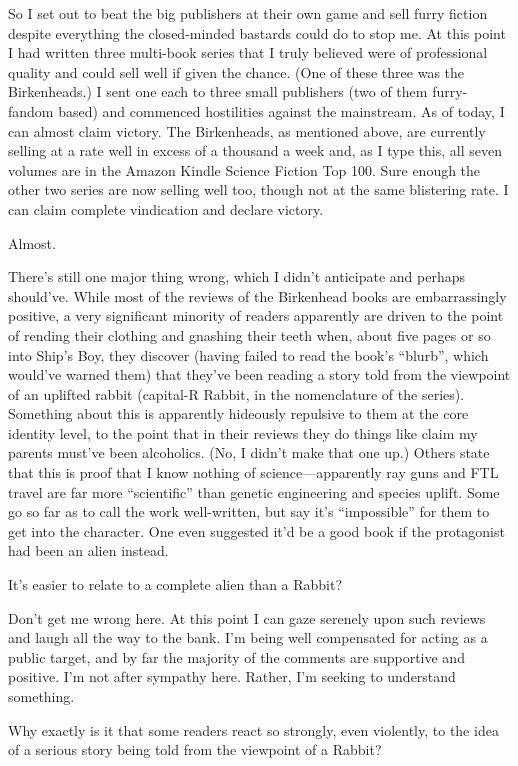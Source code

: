 So I set out to beat the big publishers at their own game and sell furry fiction despite everything the closed-minded bastards could do to stop me. At this point I had written three multi-book series that I truly believed were of professional quality and could sell well if given the chance. (One of these three was the Birkenheads.) I sent one each to three small publishers (two of them furry-fandom based) and commenced hostilities against the mainstream. As of today, I can almost claim victory. The Birkenheads, as mentioned above, are currently selling at a rate well in excess of a thousand a week and, as I type this, all seven volumes are in the Amazon Kindle Science Fiction Top 100. Sure enough the other two series are now selling well too, though not at the same blistering rate. I can claim complete vindication and declare victory.

Almost.

There's still one major thing wrong, which I didn't anticipate and perhaps should've. While most of the reviews of the Birkenhead books are embarrassingly positive, a very significant minority of readers apparently are driven to the point of rending their clothing and gnashing their teeth when, about five pages or so into Ship's Boy, they discover (having failed to read the book's ``blurb'', which would've warned them) that they've been reading a story told from the viewpoint of an uplifted rabbit (capital-R Rabbit, in the nomenclature of the series). Something about this is apparently hideously repulsive to them at the core identity level, to the point that in their reviews they do things like claim my parents must've been alcoholics. (No, I didn't make that one up.) Others state that this is proof that I know nothing of science—apparently ray guns and FTL travel are far more ``scientific'' than genetic engineering and species uplift. Some go so far as to call the work well-written, but say it's ``impossible'' for them to get into the character. One even suggested it'd be a good book if the protagonist had been an alien instead.

It's easier to relate to a complete alien than a Rabbit?

Don't get me wrong here. At this point I can gaze serenely upon such reviews and laugh all the way to the bank. I'm being well compensated for acting as a public target, and by far the majority of the comments are supportive and positive. I'm not after sympathy here. Rather, I'm seeking to understand something.

Why exactly is it that some readers react so strongly, even violently, to the idea of a serious story being told from the viewpoint of a Rabbit?

